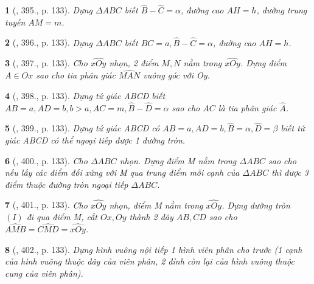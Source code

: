 \documentclass{article}
\newtheorem{baitoan}{}
\begin{document}
\begin{baitoan}[\cite{Binh_Toan_9_tap_2}, 395., p. 133]
	Dựng $\Delta ABC$ biết $\widehat{B} - \widehat{C} = \alpha$, đường cao $AH = h$, đường trung tuyến $AM = m$.
\end{baitoan}

\begin{baitoan}[\cite{Binh_Toan_9_tap_2}, 396., p. 133]
	Dựng $\Delta ABC$ biết $BC = a,\widehat{B} - \widehat{C} = \alpha$, đường cao $AH = h$.
\end{baitoan}

\begin{baitoan}[\cite{Binh_Toan_9_tap_2}, 397., p. 133]
	Cho $\widehat{xOy}$ nhọn, 2 điểm $M,N$ nằm trong $\widehat{xOy}$. Dựng điểm $A\in Ox$ sao cho tia phân giác $\widehat{MAN}$ vuông góc với Oy.
\end{baitoan}

\begin{baitoan}[\cite{Binh_Toan_9_tap_2}, 398., p. 133]
	Dựng tứ giác ABCD biết $AB = a,AD = b,b > a,AC = m,\widehat{B} - \widehat{D} = \alpha$ sao cho $AC$ là tia phân giác $\widehat{A}$.
\end{baitoan}

\begin{baitoan}[\cite{Binh_Toan_9_tap_2}, 399., p. 133]
	Dựng tứ giác ABCD có $AB = a,AD = b,\widehat{B} = \alpha,\widehat{D} = \beta$ biết tứ giác ABCD có thể ngoại tiếp được 1 đường tròn.
\end{baitoan}

\begin{baitoan}[\cite{Binh_Toan_9_tap_2}, 400., p. 133]
	Cho $\Delta ABC$ nhọn. Dựng điểm M nằm trong $\Delta ABC$ sao cho nếu lấy các điểm đối xứng với M qua trung điểm mỗi cạnh của $\Delta ABC$ thì được 3 điểm thuộc đường tròn ngoại tiếp $\Delta ABC$.
\end{baitoan}

\begin{baitoan}[\cite{Binh_Toan_9_tap_2}, 401., p. 133]
	Cho $\widehat{xOy}$ nhọn, điểm M nằm trong $\widehat{xOy}$. Dựng đường tròn $(I)$ đi qua điểm M, cắt $Ox,Oy$ thành 2 dây $AB,CD$ sao cho $\widehat{AMB} = \widehat{CMD} = \widehat{xOy}$.
\end{baitoan}

\begin{baitoan}[\cite{Binh_Toan_9_tap_2}, 402., p. 133]
	Dựng hình vuông nội tiếp 1 hình viên phân cho trước (1 cạnh của hình vuông thuộc dây của viên phân, 2 đỉnh còn lại của hình vuông thuộc cung của viên phân).
\end{baitoan}
\end{document}
